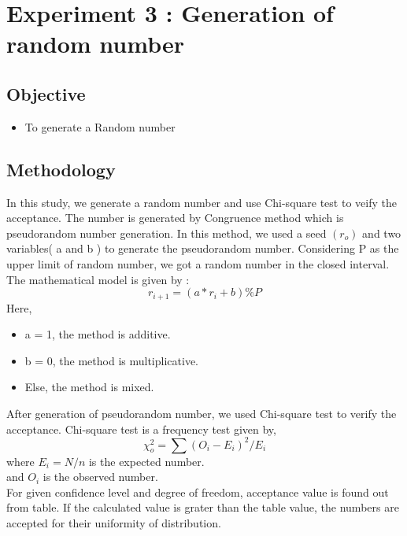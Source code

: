 \documentclass[10pt,journal,cspaper,compsoc]{IEEEtran}
\begin{document}
\section{Experiment 3 : Generation of random number}
\subsection{Objective}
  \begin{itemize}
    \item To generate a Random number
  \end{itemize}
\subsection{Methodology}
  In this study, we generate a random number and use Chi-square test to veify the acceptance.
  The number is generated by Congruence method which is pseudorandom number generation. 
  In this method, we used a seed \begin{math}
    (r_o)
  \end{math} and two variables( a and b ) to generate the pseudorandom number.
  Considering P as the upper limit of random number, we got a random number in the closed interval.
  The mathematical model is given by :
  \begin{equation}
    r_{i+1} = (a * r_i + b) \%  P
  \end{equation}
  Here,
  \begin{itemize}
    \item a = 1, the method is additive.
    \item b = 0, the method is multiplicative.
    \item Else, the method is mixed. 
  \end{itemize}
  After generation of pseudorandom number, we used Chi-square test to verify the acceptance.
  Chi-square test is a frequency test given by,
  \begin{equation}
    \chi _o ^2 = \sum (O_i - E_i)^2 / E_i
  \end{equation}
  where 
  \begin{math}
    E_i = N/n
  \end{math}
  is the expected number.\\
  and \begin{math} O_i \end{math}  is the observed number.\\
  For given confidence level and degree of freedom, acceptance value is found out from table. If
the calculated value is grater than the table value, the numbers are accepted for their uniformity of distribution.
  
\end{document}
